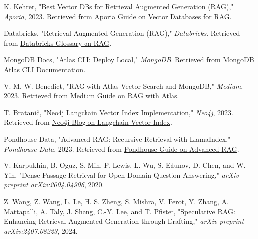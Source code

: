\documentclass{wseas}
\begin{document}
\begin{thebibliography}{9}
   K. Kehrer, "Best Vector DBs for Retrieval Augmented Generation (RAG)," \textit{Aporia}, 2023. Retrieved from \href{https://www.aporia.com/learn/best-vector-dbs-for-retrieval-augmented-generation-rag/}{Aporia Guide on Vector Databases for RAG}.
  
   Databricks, "Retrieval-Augmented Generation (RAG)," \textit{Databricks}. Retrieved from \href{https://www.databricks.com/glossary/retrieval-augmented-generation-rag}{Databricks Glossary on RAG}.
  
   MongoDB Docs, "Atlas CLI: Deploy Local," \textit{MongoDB}. Retrieved from \href{https://www.mongodb.com/docs/atlas/cli/current/atlas-cli-deploy-local/}{MongoDB Atlas CLI Documentation}.
  
   V. M. W. Benedict, "RAG with Atlas Vector Search and MongoDB," \textit{Medium}, 2023. Retrieved from \href{https://medium.com/@if-21062/rag-with-atlas-vector-search-mongodb-0d2420e00b64}{Medium Guide on RAG with Atlas}.
  
   T. Bratanič, "Neo4j Langchain Vector Index Implementation," \textit{Neo4j}, 2023. Retrieved from \href{https://neo4j.com/developer-blog/neo4j-langchain-vector-index-implementation/}{Neo4j Blog on Langchain Vector Index}.
  
   Pondhouse Data, "Advanced RAG: Recursive Retrieval with LlamaIndex," \textit{Pondhouse Data}, 2023. Retrieved from \href{https://www.pondhouse-data.com/blog/advanced-rag-recursive-retrieval-with-llamaindex}{Pondhouse Guide on Advanced RAG}.
  
   V. Karpukhin, B. Oguz, S. Min, P. Lewis, L. Wu, S. Edunov, D. Chen, and W. Yih, "Dense Passage Retrieval for Open-Domain Question Answering," \textit{arXiv preprint arXiv:2004.04906}, 2020.
  
   Z. Wang, Z. Wang, L. Le, H. S. Zheng, S. Mishra, V. Perot, Y. Zhang, A. Mattapalli, A. Taly, J. Shang, C.-Y. Lee, and T. Pfister, "Speculative RAG: Enhancing Retrieval-Augmented Generation through Drafting," \textit{arXiv preprint arXiv:2407.08223}, 2024.
  
\end{thebibliography}
\end{document}
